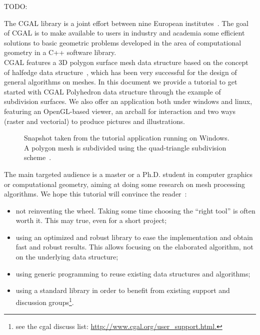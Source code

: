 TODO:



The CGAL library is a joint effort between nine European
institutes~\cite{fgkss-dccga-00}. The goal of CGAL is to make
available to users in industry and academia some efficient solutions
to basic geometric problems developed in the area of computational
geometry in a C++ software library.\\


CGAL features a 3D polygon surface mesh data structure based on the
concept of halfedge data structure~\cite{k-ugpdd-99}, which has been
very successful for the design of general algorithms on meshes. In
this document we provide a tutorial to get started with CGAL
Polyhedron data structure through the example of subdivision
surfaces. We also offer an application both under windows and linux,
featuring an OpenGL-based viewer, an arcball for interaction and two
ways (raster and vectorial) to produce pictures and illustrations.\\


\begin{figure}[htb]
    \caption{Snapshot taken from the tutorial application running
             on Windows. A polygon mesh is subdivided using the
             quad-triangle subdivision scheme~\cite{sl-qts-02}.}
    \label{fig:teaser}
\end{figure}
        


The main targeted audience is a master or a Ph.D. student in computer
graphics or computational geometry, aiming at doing some research on
mesh processing algorithms. We hope this tutorial will convince the
reader~:

\begin{itemize}

\item 
not reinventing the wheel. Taking some time choosing the ``right
tool'' is often worth it. This may true, even for a short project;

\item 
using an optimized and robust library to ease the implementation and
obtain fast and robust results. This allows focusing on the elaborated
algorithm, not on the underlying data structure;

\item 
using generic programming to reuse existing data structures
and algorithms;

\item 
using a standard library in order to benefit from existing support and
discussion groups\footnote{see the cgal discuss list:
\href{http://www.cgal.org/user_support.html}
{http://www.cgal.org/user\_support.html.}}.

\end{itemize}               
